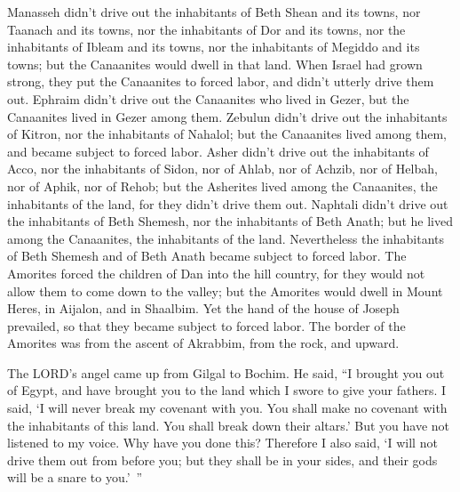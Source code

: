 \myverse{}Manasseh didn’t drive out the inhabitants of Beth Shean and its
towns, nor Taanach and its towns, nor the inhabitants of Dor and its towns, nor the inhabitants of Ibleam
and its towns, nor the inhabitants of Megiddo and its towns; but the Canaanites would dwell in that land.
\myverse{}When Israel had grown strong, they put the Canaanites to forced labor, and
didn’t utterly drive them out.
\myverse{}Ephraim didn’t drive out the Canaanites who lived in Gezer, but the Canaanites
lived in Gezer among them.
\myverse{}Zebulun didn’t drive out the inhabitants of Kitron, nor the inhabitants of
Nahalol; but the Canaanites lived among them, and became subject to forced labor.
\myverse{}Asher didn’t drive out the inhabitants of Acco, nor the inhabitants of Sidon,
nor of Ahlab, nor of Achzib, nor of Helbah, nor of Aphik, nor of Rehob;
\myverse{}but the Asherites lived among the Canaanites, the inhabitants of the land,
for they didn’t drive them out.
\myverse{}Naphtali didn’t drive out the inhabitants of Beth Shemesh, nor the inhabitants
of Beth Anath; but he lived among the Canaanites, the inhabitants of the land. Nevertheless the inhabitants
of Beth Shemesh and of Beth Anath became subject to forced labor.
\myverse{}The Amorites forced the children of Dan into the hill country, for they would
not allow them to come down to the valley;
\myverse{}but the Amorites would dwell in Mount Heres, in Aijalon, and in Shaalbim.
Yet the hand of the house of Joseph prevailed, so that they became subject to forced labor.
\myverse{}The border of the Amorites was from the ascent of Akrabbim, from the rock,
and upward.


\mychapter{} \myverse*{}The LORD’s angel came up from Gilgal to Bochim. He said, “I brought
you out of Egypt, and have brought you to the land which I swore to give your fathers. I said, ‘I will
never break my covenant with you.
\myverse{}You shall make no covenant with the inhabitants of this land. You shall break
down their altars.’ But you have not listened to my voice. Why have you done this?
\myverse{}Therefore I also said, ‘I will not drive them out from before you; but they
shall be in your sides, and their gods will be a snare to you.’ ”

